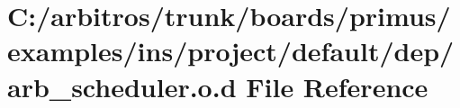 \hypertarget{ins_2project_2default_2dep_2arb__scheduler_8o_8d}{\section{C\-:/arbitros/trunk/boards/primus/examples/ins/project/default/dep/arb\-\_\-scheduler.o.\-d File Reference}
\label{ins_2project_2default_2dep_2arb__scheduler_8o_8d}
}
